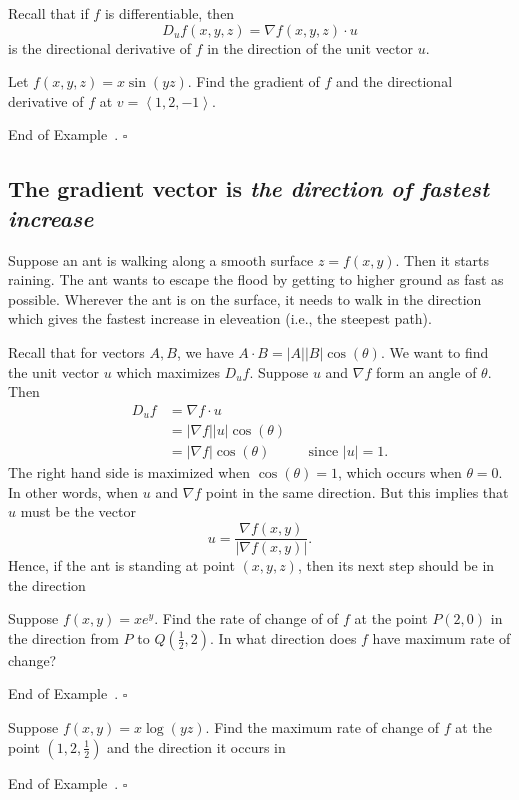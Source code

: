 \documentclass[10pt]{article}
\theoremstyle{definition}
\newtheorem{example}[theorem]{Example}
\renewenvironment{example}
{\begin{oldexample}}
  {\par\smallskip\hfill   End of Example~\theexample. $\square$    \par\end{oldexample}}
\newcommand{\1}[1]{\textbf{1}_{\left[#1\right]}} %
\begin{document}
Recall that if $f$ is differentiable, then
\begin{equation*}
  D_{u}f(x,y,z) = \nabla f (x,y,z)\cdot u
\end{equation*}
is the directional derivative of $f$ in the direction of the unit vector $u$.
\begin{example}
  Let $f(x,y,z)= x \sin(yz)$. Find the gradient of $f$ and the directional
  derivative of $f$ at $v=\left\langle 1,2,-1 \right\rangle $.
\end{example}


\subsection{The gradient vector is  \textit{the direction of fastest increase}}
Suppose an ant is walking along a smooth surface $z=f(x,y)$. Then it starts
raining. The ant wants to escape the flood by getting to higher ground as fast
as possible. Wherever the ant is on the surface, it needs to walk in the direction
which gives the fastest increase in eleveation (i.e., the steepest path).

Recall that for vectors $A,B$, we have $A\cdot B = |A| |B| \cos(\theta)$.
We want to find the unit vector $u$ which maximizes $D_{u}f$. Suppose $u$ and
$\nabla f$ form an angle of $\theta$. Then
\begin{align*}
  D_{u} f 
  &= \nabla f\cdot u \\
  &=  |\nabla f| |u| \cos(\theta)\\
  &=  |\nabla f| \cos(\theta) &&\text{since $|u| =1$.}
\end{align*}
The right hand side is maximized when $\cos(\theta)=1$, which occurs when
$\theta=0$. In other words, when $u$ and $\nabla f$ point in the same
direction. But this implies that $u$ must be the vector
\begin{equation*}
  u = \frac{\nabla f(x,y)}{|\nabla f(x,y)|}.
\end{equation*}
Hence, if the ant is standing at point $(x,y,z)$, then its next step should be
in the direction


\begin{example}
  Suppose $f(x,y) = xe^{y}$. Find the rate of change of of $f$ at the point
  $P(2,0)$ in the direction from $P$ to $Q(\frac{1}{2},2)$. In what direction
  does $f$ have maximum rate of change?
\end{example}


\begin{example}
  Suppose $f(x,y) = x\log(yz)$. Find the maximum rate of change of $f$ at the
  point $(1,2,\frac{1}{2})$ and the direction it occurs in
\end{example}
\end{document}
